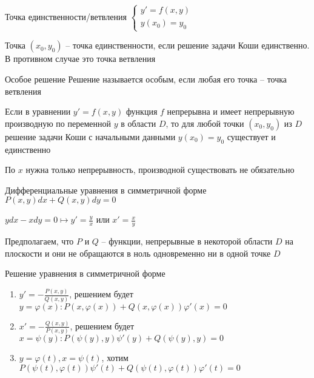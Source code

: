 \documentclass[12pt]{article}
\begin{document}
\begin{defin}{Точка единственности/ветвления}
    $\begin{cases}
        y' = f(x, y) \\
        y(x_0) = y_0
    \end{cases}$

    Точка $(x_0, y_0)$ -- точка единственности, если решение задачи Коши единственно. В противном случае это точка ветвления 
\end{defin}

\begin{defin}{Особое решение}
    Решение называется особым, если любая его точка -- точка ветвления
\end{defin}

\begin{theo}{}
    Если в уравнении $y' = f(x, y)$ функция $f$ непрерывна и имеет непрерывную производную по переменной $y$ в области $D$, то для любой точки $(x_0, y_0)$ из $D$ решение задачи Коши с начальными данными $y(x_0) = y_0$ существует и единственно
\end{theo}

\begin{Remark}{}
    По $x$ нужна только непрерывность, производной существовать не обязательно
\end{Remark}

\begin{defin}{Дифференциальные уравнения в симметричной форме}
    $P(x, y)dx + Q(x, y)dy = 0$
\end{defin}

\begin{Example}{}
    $ydx - xdy = 0 \mapsto y' = \frac{y}{x}$ или $x' = \frac{x}{y}$
\end{Example}

\begin{Remark}{}
    Предполагаем, что $P$ и $Q$ -- функции, непрерывные в некоторой области $D$ на плоскости и они не обращаются в ноль одновременно ни в одной точке $D$
\end{Remark}

\begin{defin}{Решение уравнения в симметричной форме}
    \begin{enumerate}
        \item $y' = -\frac{P(x, y)}{Q(x, y)}$, решением будет $y = \varphi(x) : P(x, \varphi(x)) + Q(x, \varphi(x))\varphi'(x) = 0$
        \item $x' = -\frac{Q(x, y)}{P(x, y)}$, решением будет $x = \psi(y) : P(\psi(y), y)\psi'(y) + Q(\psi(y), y) = 0$
        \item $y = \varphi(t), x = \psi(t)$, хотим $P(\psi(t), \varphi(t))\psi'(t) + Q(\psi(t), \varphi(t))\varphi'(t) = 0$
    \end{enumerate}
\end{defin}
\end{document}

